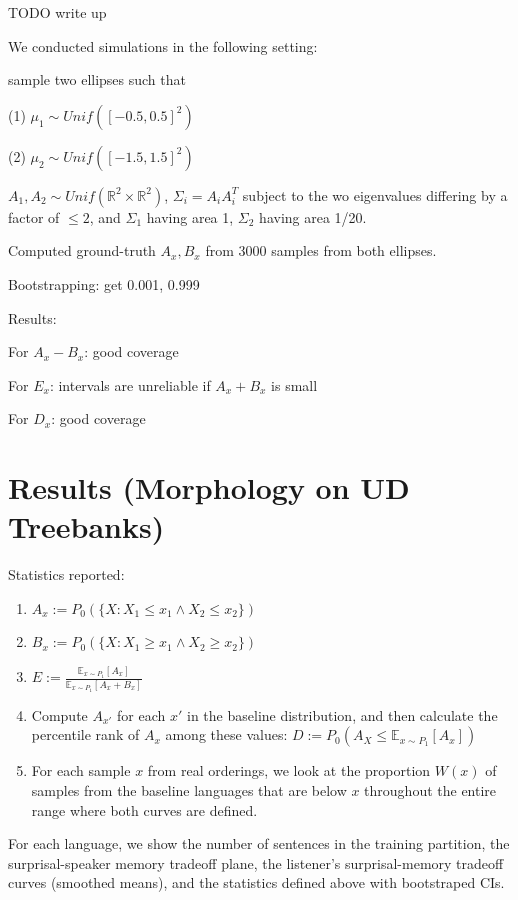 \documentclass[11pt,letterpaper]{article}
\newcommand{\E}[0]{\mathbb{E}}
\begin{document}
TODO write up

We conducted simulations in the following setting:

sample two ellipses such that

(1) $\mu_1 \sim Unif([-0.5, 0.5]^2)$

(2) $\mu_2 \sim Unif([-1.5, 1.5]^2)$

$A_1, A_2 \sim Unif(\mathbb{R}^2 \times \mathbb{R}^2)$, $\Sigma_i = A_i A_i^T$ subject to the wo eigenvalues differing by a factor of $\leq 2$, and $\Sigma_1$ having area 1, $\Sigma_2$ having area 1/20.

Computed ground-truth $A_x, B_x$ from 3000 samples from both ellipses.

Bootstrapping: get 0.001, 0.999

Results:

For $A_x-B_x$: good coverage

For $E_x$: intervals are unreliable if $A_x + B_x$ is small

For $D_x$: good coverage


\section{Results (Morphology on UD Treebanks)}\label{sec:results-table}

Statistics reported:

\begin{enumerate}
	\item $A_x := P_0(\{X : X_1 \leq x_1 \wedge X_2 \leq x_2\})$
	\item $B_x := P_0(\{X : X_1 \geq x_1 \wedge X_2 \geq x_2\})$
	\item  $E := \frac{\E_{x \sim P_1}[A_x]}{\E_{x \sim P_1}[A_x+B_x]}$
	\item Compute $A_{x'}$ for each $x'$ in the baseline distribution, and then calculate the percentile rank of $A_x$ among these values:
$D := P_0(A_X \leq \E_{x \sim P_1}[A_x])$
\item For each sample $x$ from real orderings, we look at the proportion $W(x)$ of samples from the baseline languages that are below $x$ throughout the entire range where both curves are defined.

\end{enumerate}


For each language, we show the number of sentences in the training partition, the surprisal-speaker memory tradeoff plane, the listener's surprisal-memory tradeoff curves (smoothed means), and the statistics defined above with bootstraped CIs.
\end{document}
